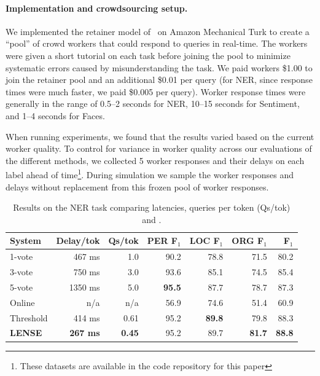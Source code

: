 \paragraph{Implementation and crowdsourcing setup.}
We implemented the retainer model of~\cite{bernstein2011crowds} on Amazon Mechanical Turk to create a ``pool'' of crowd workers that could respond to queries in real-time.
The workers were given a short tutorial on each task before joining the pool to minimize systematic errors caused by misunderstanding the task.
We paid workers \$1.00 to join the retainer pool and an additional \$0.01 per query (for NER, since response times were much faster, we paid \$0.005 per query).
Worker response times were generally in the range of 0.5--2 seconds for NER, 10--15 seconds for Sentiment, and 1--4 seconds for Faces.

When running experiments, we found that the results varied based on the current worker quality. %
To control for variance in worker quality across our evaluations of the different methods, we collected 5 worker responses and their delays on each label ahead of time\footnote{These datasets are available in the code repository for this paper}.
During simulation we sample the worker responses and delays without replacement from this frozen pool of worker responses.

\begin{table}[t]
\centering
\begin{tabular}{l r r r r r r}
  \toprule
      \textbf{System} & \textbf{Delay/tok} & \textbf{Qs/tok} & \textbf{PER F$_1$} & \textbf{LOC F$_1$} & \textbf{ORG F$_1$} & \textbf{F$_1$}
    \\ \midrule
    1-vote & 467 ms & 1.0 & 90.2 & 78.8 & 71.5 & 80.2 \\
    3-vote & 750 ms & 3.0 & 93.6 & 85.1 & 74.5 & 85.4 \\
    5-vote & 1350 ms & 5.0 & \textbf{95.5} & 87.7 & 78.7 & 87.3  \\ \midrule
    Online & n/a & n/a & 56.9 & 74.6 & 51.4 & 60.9 \\
    Threshold & 414 ms & 0.61 & 95.2 & \textbf{89.8} & 79.8 & 88.3 \\
    \textbf{LENSE} & \textbf{267 ms} & \textbf{0.45} & 95.2 & 89.7 & \textbf{81.7} & \textbf{88.8}  \\
    \bottomrule
\end{tabular}
\caption[Results on NER]{\label{tbl:results-ner} Results on the NER task comparing latencies, queries per token (Qs/tok)
and \fone{}.}
\end{table}

